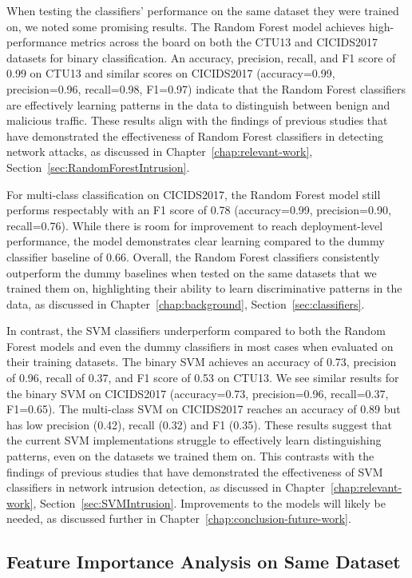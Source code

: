When testing the classifiers' performance on the same dataset they were trained on, we noted some promising results. The Random Forest model achieves high-performance metrics across the board on both the CTU13 and CICIDS2017 datasets for binary classification. An accuracy, precision, recall, and F1 score of 0.99 on CTU13 and similar scores on CICIDS2017 (accuracy=0.99, precision=0.96, recall=0.98, F1=0.97) indicate that the Random Forest classifiers are effectively learning patterns in the data to distinguish between benign and malicious traffic. These results align with the findings of previous studies that have demonstrated the effectiveness of Random Forest classifiers in detecting network attacks, as discussed in Chapter~\ref{chap:relevant-work}, Section~\ref{sec:RandomForestIntrusion}.

For multi-class classification on CICIDS2017, the Random Forest model still performs respectably with an F1 score of 0.78 (accuracy=0.99, precision=0.90, recall=0.76). While there is room for improvement to reach deployment-level performance, the model demonstrates clear learning compared to the dummy classifier baseline of 0.66. Overall, the Random Forest classifiers consistently outperform the dummy baselines when tested on the same datasets that we trained them on, highlighting their ability to learn discriminative patterns in the data, as discussed in Chapter~\ref{chap:background}, Section~\ref{sec:classifiers}.

In contrast, the SVM classifiers underperform compared to both the Random Forest models and even the dummy classifiers in most cases when evaluated on their training datasets. The binary SVM achieves an accuracy of 0.73, precision of 0.96, recall of 0.37, and F1 score of 0.53 on CTU13. We see similar results for the binary SVM on CICIDS2017 (accuracy=0.73, precision=0.96, recall=0.37, F1=0.65). The multi-class SVM on CICIDS2017 reaches an accuracy of 0.89 but has low precision (0.42), recall (0.32) and F1 (0.35). These results suggest that the current SVM implementations struggle to effectively learn distinguishing patterns, even on the datasets we trained them on. This contrasts with the findings of previous studies that have demonstrated the effectiveness of SVM classifiers in network intrusion detection, as discussed in Chapter~\ref{chap:relevant-work}, Section~\ref{sec:SVMIntrusion}. Improvements to the models will likely be needed, as discussed further in Chapter~\ref{chap:conclusion-future-work}.

\subsection{Feature Importance Analysis on Same Dataset}\label{subsec:feature-importance-analysis-same-dataset}

